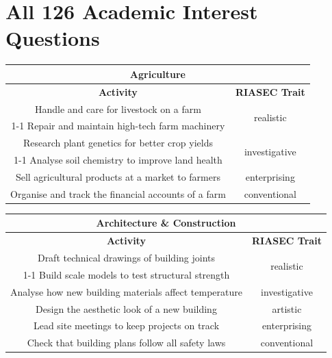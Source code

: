 \section{All 126 Academic Interest Questions}
\label{sec:all-126-questions}

\begin{table}[H]
\centering
\begin{tabular}{|c|c|}
\hline
\multicolumn{2}{|c|}{\textbf{Agriculture}}\\
\hline
\hline
\textbf{Activity} & \textbf{RIASEC Trait}\\
\hline
Handle and care for livestock on a farm & \multirow{2}{*}{realistic}\\
\cline{1-1}
Repair and maintain high-tech farm machinery & \\
\hline
Research plant genetics for better crop yields & \multirow{2}{*}{investigative}\\
\cline{1-1}
Analyse soil chemistry to improve land health & \\
\hline
Sell agricultural products at a market to farmers & enterprising\\
\hline
Organise and track the financial accounts of a farm & conventional\\
\hline
\end{tabular}
\end{table}

\begin{table}[H]
\centering
\begin{tabular}{|c|c|}
\hline
\multicolumn{2}{|c|}{\textbf{Architecture \& Construction}}\\
\hline
\hline
\textbf{Activity} & \textbf{RIASEC Trait}\\
\hline
Draft technical drawings of building joints & \multirow{2}{*}{realistic}\\
\cline{1-1}
Build scale models to test structural strength & \\
\hline
Analyse how new building materials affect temperature & investigative\\
\hline
Design the aesthetic look of a new building & artistic\\
\hline
Lead site meetings to keep projects on track & enterprising\\
\hline
Check that building plans follow all safety laws & conventional\\
\hline
\end{tabular}
\end{table}

